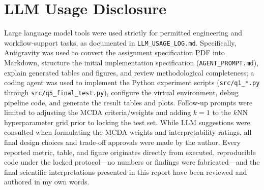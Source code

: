 \section{LLM Usage Disclosure}
\label{sec:llm}

Large language model tools were used strictly for permitted engineering and workflow-support tasks, as documented in \texttt{LLM\_USAGE\_LOG.md}. Specifically, Antigravity was used to convert the assignment specification PDF into Markdown, structure the initial implementation specification (\texttt{AGENT\_PROMPT.md}), explain generated tables and figures, and review methodological completeness; a coding agent was used to implement the Python experiment scripts (\texttt{src/q1\_*.py} through \texttt{src/q5\_final\_test.py}), configure the virtual environment, debug pipeline code, and generate the result tables and plots. Follow-up prompts were limited to adjusting the MCDA criteria/weights and adding $k = 1$ to the $k$NN hyperparameter grid prior to locking the test set. While LLM suggestions were consulted when formulating the MCDA weights and interpretability ratings, all final design choices and trade-off approvals were made by the author. Every reported metric, table, and figure originates directly from executed, reproducible code under the locked protocol---no numbers or findings were fabricated---and the final scientific interpretations presented in this report have been reviewed and authored in my own words.
